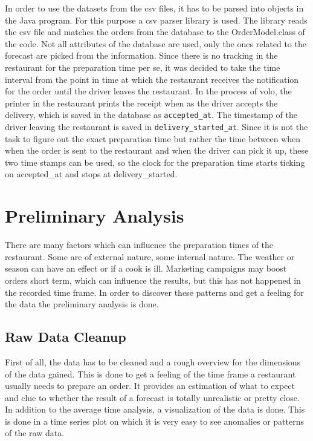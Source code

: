 In order to use the datasets from the csv files, it has to be parsed into objects in the Java program. For this purpose a csv parser library is used. The library reads the csv file and matches the orders from the database to the OrderModel.class of the code. Not all attributes of the database are used, only the ones related to the forecast are picked from the information. Since there is no tracking in the restaurant for the preparation time per se, it was decided to take the time interval from the point in time at which the restaurant receives the notification for the order until the driver leaves the restaurant. In the process of volo, the printer in the restaurant prints the receipt when as the driver accepts the delivery, which is saved in the database as \texttt{accepted\_at}. The timestamp of the driver leaving the restaurant is saved in \texttt{delivery\_started\_at}. Since it is not the task to figure out the exact preparation time but rather the time between when when the order is sent to the restaurant and when the driver can pick it up,  these two time stamps can be used, so the clock for the preparation time starts ticking on accepted_at and stops at delivery_started.
\section{Preliminary Analysis}\label{section:Preliminary Analysis}
There are many factors which can influence the preparation times of the restaurant. Some are of external nature, some internal nature. The weather or season can have an effect or if a cook is ill.\newline
Marketing campaigns may boost orders short term, which can influence the results, but this has not happened in the recorded time frame.\newline
In order to discover these patterns and get a feeling for the data the preliminary analysis is done.
\subsection{Raw Data Cleanup}\label{subsection:Raw Data Cleanup}
First of all, the data has to be cleaned and a rough overview for the dimensions of the data gained. This is done to get a feeling of the time frame a restaurant usually needs to prepare an order. It provides an estimation of what to expect and clue to whether the result of a forecast is totally unrealistic or pretty close. In addition to the average time analysis, a visualization of the data is done. This is done in a time series plot on which it is very easy to see anomalies or patterns of the raw data.\newline

